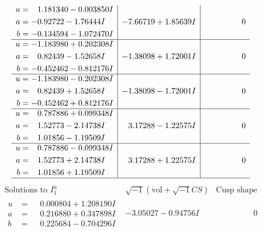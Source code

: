 \documentclass[1p]{elsarticle_modified}
\theoremstyle{definition}
\newcommand{\I}{\sqrt{-1}}
\begin{document}
$$\begin{array}{c|c|c}
\begin{aligned}
u &= \phantom{-}1.181340 - 0.003850 I \\
a &= -0.92722 - 1.76444 I \\
b &= -0.134594 - 1.072470 I\end{aligned}
 & -7.66719 + 1.85639 I & \phantom{-0.000000 } 0 \\ \hline\begin{aligned}
u &= -1.183980 + 0.202308 I \\
a &= \phantom{-}0.82439 - 1.52658 I \\
b &= -0.452462 - 0.812176 I\end{aligned}
 & -1.38098 + 1.72001 I & \phantom{-0.000000 } 0 \\ \hline\begin{aligned}
u &= -1.183980 - 0.202308 I \\
a &= \phantom{-}0.82439 + 1.52658 I \\
b &= -0.452462 + 0.812176 I\end{aligned}
 & -1.38098 - 1.72001 I & \phantom{-0.000000 } 0 \\ \hline\begin{aligned}
u &= \phantom{-}0.787886 + 0.099348 I \\
a &= \phantom{-}1.52773 - 2.14738 I \\
b &= \phantom{-}1.01856 - 1.19509 I\end{aligned}
 & \phantom{-}3.17288 - 1.22575 I & \phantom{-0.000000 } 0 \\ \hline\begin{aligned}
u &= \phantom{-}0.787886 - 0.099348 I \\
a &= \phantom{-}1.52773 + 2.14738 I \\
b &= \phantom{-}1.01856 + 1.19509 I\end{aligned}
 & \phantom{-}3.17288 + 1.22575 I & \phantom{-0.000000 } 0\\
 \hline 
 \end{array}$$\newpage$$\begin{array}{c|c|c}  
\text{Solutions to }I^u_{1}& \I (\text{vol} + \sqrt{-1}CS) & \text{Cusp shape}\\
 \hline 
\begin{aligned}
u &= \phantom{-}0.000804 + 1.208190 I \\
a &= \phantom{-}0.216880 + 0.347898 I \\
b &= \phantom{-}0.225684 - 0.704296 I\end{aligned}
 & -3.05027 - 0.94756 I & \phantom{-0.000000 } 0 \\ \hline\begin{aligned}

\end{aligned}
\end{array}$$
\end{document}
